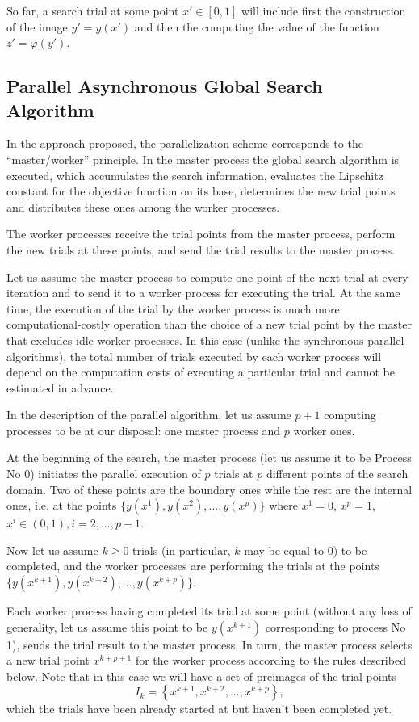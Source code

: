 \documentclass{svproc}
\begin{document}
So far, a search trial at some point $x'\in[0,1]$ will include first the construction of the image $y'=y(x')$ and then the computing the value of the function $z'=\varphi(y')$.

\subsection{Parallel Asynchronous Global Search Algorithm}

In the approach proposed, the parallelization scheme corresponds to the ``master/worker'' principle.
In the master process the global search algorithm is executed, which accumulates the search information, evaluates the Lipschitz constant for the objective function on its base, determines the new trial points and distributes these ones among the worker processes. 

The worker processes receive the trial points from the master process, perform the new trials at these points, and send the trial results to the master process. 

Let us assume the master process to compute one point of the next trial at every iteration and to send it to a worker process for executing the trial. 
At the same time, the execution of the trial by the worker process is much more computational-costly operation than the choice of a new trial point by the master that excludes idle worker processes. 
In this case (unlike the synchronous parallel algorithms), the total number of trials executed by each worker process will depend on the computation costs of executing a particular trial and cannot be estimated in advance.

In the description of the parallel algorithm, let us assume $p+1$ computing processes to be at our disposal: one master process and $p$ worker ones.
 
At the beginning of the search, the master process (let us assume it to be Process No 0) initiates the parallel execution of $p$ trials at $p$ different points of the search domain. 
Two of these points are the boundary ones while the rest are the internal ones, i.e. at the points $\{y(x^1), y(x^2), ...,y(x^p)\}$ where 
$x^1 = 0$, $x^p = 1$, $x^i\in(0,1), i=2,..., p-1$.

Now let us assume $k\geq 0$ trials (in particular, $k$ may be equal to 0) to be completed, and the worker processes are performing the trials at the points $\{y(x^{k+1}), y(x^{k+2}), ...,y(x^{k+p})\}$. 

Each worker process having completed its trial at some point (without any loss of generality, let us assume this point to be $y(x^{k+1})$ corresponding to process No 1), sends the trial result to the master process. 
In turn, the master process selects a new trial point $x^{k+p+1}$ for the worker process according to the rules described below.
Note that in this case we will have a set of preimages of the trial points
\[
I_k = \left\{ x^{k+1},x^{k+2},...,x^{k+p} \right\},
\]
which the trials have been already started at but haven't been completed yet.
\end{document}
